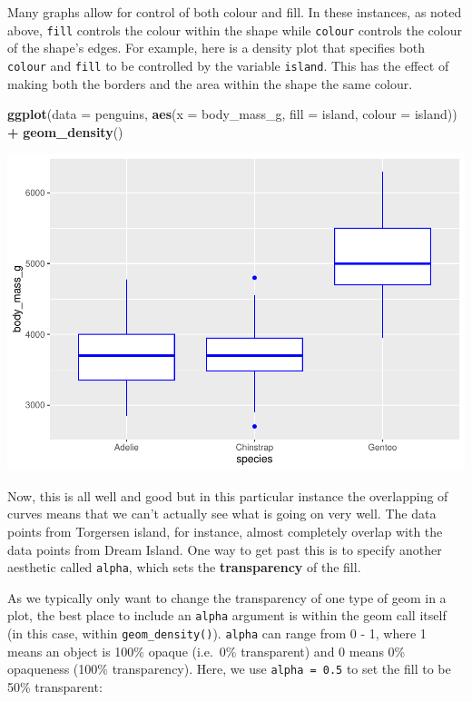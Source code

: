 \documentclass[
]{book}
\newenvironment{Shaded}{\begin{snugshade}}{\end{snugshade}}
\newcommand{\AttributeTok}[1]{\textcolor[rgb]{0.13,0.29,0.53}{#1}}
\newcommand{\FunctionTok}[1]{\textcolor[rgb]{0.13,0.29,0.53}{\textbf{#1}}}
\newcommand{\NormalTok}[1]{#1}
\newcommand{\SpecialCharTok}[1]{\textcolor[rgb]{0.81,0.36,0.00}{\textbf{#1}}}
\begin{document}
Many graphs allow for control of both colour and fill. In these instances, as noted above, \texttt{fill} controls the colour within the shape while \texttt{colour} controls the colour of the shape's edges. For example, here is a density plot that specifies both \texttt{colour} and \texttt{fill} to be controlled by the variable \texttt{island}. This has the effect of making both the borders and the area within the shape the same colour.

\begin{Shaded}
\begin{Highlighting}[]
\FunctionTok{ggplot}\NormalTok{(}\AttributeTok{data =}\NormalTok{ penguins, }\FunctionTok{aes}\NormalTok{(}\AttributeTok{x =}\NormalTok{ body\_mass\_g, }\AttributeTok{fill =}\NormalTok{ island, }\AttributeTok{colour =}\NormalTok{ island)) }\SpecialCharTok{+} 
  \FunctionTok{geom\_density}\NormalTok{()}
\end{Highlighting}
\end{Shaded}

\includegraphics{_main_files/figure-latex/unnamed-chunk-60-1.pdf}

Now, this is all well and good but in this particular instance the overlapping of curves means that we can't actually see what is going on very well. The data points from Torgersen island, for instance, almost completely overlap with the data points from Dream Island. One way to get past this is to specify another aesthetic called \texttt{alpha}, which sets the \textbf{transparency} of the fill.

As we typically only want to change the transparency of one type of geom in a plot, the best place to include an \texttt{alpha} argument is within the geom call itself (in this case, within \texttt{geom\_density()}). \texttt{alpha} can range from 0 - 1, where 1 means an object is 100\% opaque (i.e.~0\% transparent) and 0 means 0\% opaqueness (100\% transparency). Here, we use \texttt{alpha\ =\ 0.5} to set the fill to be 50\% transparent:
\end{document}
